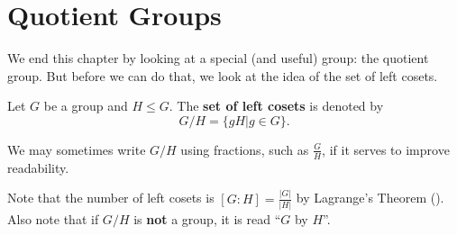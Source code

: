 \section{Quotient Groups}
We end this chapter by looking at a special (and useful) group: the quotient group. But before we can do that, we look at the idea of the set of left cosets.

\begin{definition}
    Let $G$ be a group and $H \leq G$. The \textbf{set of left cosets} is denoted by
    \[
        G/H = \{gH \vert g \in G \}.
    \]
\end{definition}
\begin{remark}
    We may sometimes write $G/H$ using fractions, such as $\frac GH$, if it serves to improve readability.
\end{remark}

Note that the number of left cosets is $[G:H] = \frac{|G|}{|H|}$ by Lagrange's Theorem (). Also note that if $G/H$ is \textbf{not} a group, it is read ``$G$ by $H$''.

